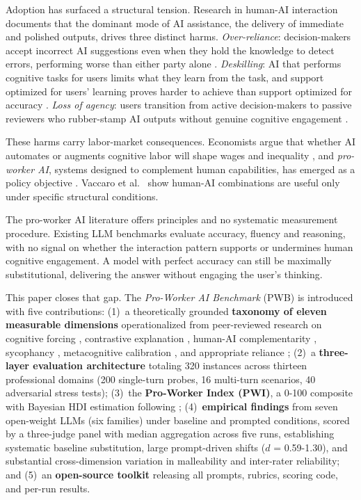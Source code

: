 \documentclass{article}
\begin{document}
Adoption has surfaced a structural tension. Research in human-AI interaction documents that the dominant mode of AI assistance, the delivery of immediate and polished outputs, drives three distinct harms. \textit{Over-reliance}: decision-makers accept incorrect AI suggestions even when they hold the knowledge to detect errors, performing worse than either party alone \cite{bucinca2021trust, bansal2021does}. \textit{Deskilling}: AI that performs cognitive tasks for users limits what they learn from the task, and support optimized for users' learning proves harder to achieve than support optimized for accuracy \cite{gajos2022people, bucinca2024towards}. \textit{Loss of agency}: users transition from active decision-makers to passive reviewers who rubber-stamp AI outputs without genuine cognitive engagement \cite{green2019principles, kaur2020interpreting}.

These harms carry labor-market consequences. Economists argue that whether AI automates or augments cognitive labor will shape wages and inequality \cite{acemoglu2024simple, autor2022new}, and \textit{pro-worker AI}, systems designed to complement human capabilities, has emerged as a policy objective \cite{acemoglu2024proworker}. Vaccaro et al.\ \cite{vaccaro2024combinations} show human-AI combinations are useful only under specific structural conditions.

The pro-worker AI literature offers principles and no systematic measurement procedure. Existing LLM benchmarks evaluate accuracy, fluency and reasoning, with no signal on whether the interaction pattern supports or undermines human cognitive engagement. A model with perfect accuracy can still be maximally substitutional, delivering the answer without engaging the user's thinking.

This paper closes that gap. The \textit{Pro-Worker AI Benchmark} (PWB) is introduced with five contributions: (1)~a theoretically grounded \textbf{taxonomy of eleven measurable dimensions} operationalized from peer-reviewed research on cognitive forcing \cite{bucinca2021trust}, contrastive explanation \cite{bucinca2024contrastive}, human-AI complementarity \cite{bucinca2024towards,vaccaro2024combinations}, sycophancy \cite{sharma2023sycophancy}, metacognitive calibration \cite{steyvers2025metacognition}, and appropriate reliance \cite{schemmer2023appropriate}; (2)~a \textbf{three-layer evaluation architecture} totaling 320 instances across thirteen professional domains (200 single-turn probes, 16 multi-turn scenarios, 40 adversarial stress tests); (3)~the \textbf{Pro-Worker Index (PWI)}, a 0-100 composite with Bayesian HDI estimation following \cite{bowyer2025clt}; (4)~\textbf{empirical findings} from seven open-weight LLMs (six families) under baseline and prompted conditions, scored by a three-judge panel \cite{gu2024llmjudge} with median aggregation across five runs, establishing systematic baseline substitution, large prompt-driven shifts ($d$ = 0.59-1.30), and substantial cross-dimension variation in malleability and inter-rater reliability; and (5)~an \textbf{open-source toolkit} releasing all prompts, rubrics, scoring code, and per-run results.
\end{document}
